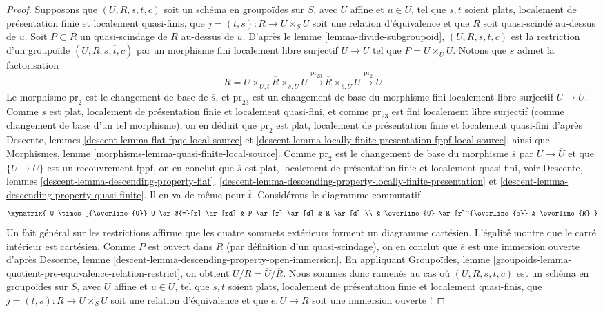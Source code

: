 \begin{proof}
\medskip\noindent
Supposons que $(U, R, s, t, c)$ soit un schéma en groupoïdes sur $S$,
avec $U$ affine et $u \in U$, tel que $s, t$ soient plats, localement
de présentation finie et localement quasi-finis, que
$j = (t, s) : R \to U \times_S U$ soit une relation d'équivalence
et que $R$ soit quasi-scindé au-dessus de $u$. Soit $P \subset R$ un quasi-scindage
de $R$ au-dessus de $u$. D'après le
lemme \ref{lemma-divide-subgroupoid},
$(U, R, s, t, c)$ est la restriction d'un groupoïde
$(\overline{U}, \overline{R}, \overline{s}, \overline{t}, \overline{c})$
par un morphisme fini localement libre surjectif $U \to \overline{U}$ tel que
$P = U \times_{\overline{U}} U$. Notons que $s$ admet la factorisation
$$
R = U \times_{\overline{U}, \overline{t}} \overline{R}
\times_{\overline{s}, \overline{U}} U
\xrightarrow{\text{pr}_{23}}
\overline{R} \times_{\overline{s}, \overline{U}} U
\xrightarrow{\text{pr}_2} U
$$
Le morphisme $\text{pr}_2$ est le changement de base de $\overline{s}$, et
$\text{pr}_{23}$ est un changement de base du morphisme fini localement libre
surjectif $U \to \overline{U}$. Comme $s$ est plat, localement
de présentation finie et localement quasi-fini, et comme $\text{pr}_{23}$
est fini localement libre surjectif (comme changement de base d'un tel morphisme),
on en déduit que $\text{pr}_2$ est plat, localement
de présentation finie et localement quasi-fini d'après
Descente, lemmes
\ref{descent-lemma-flat-fpqc-local-source} et
\ref{descent-lemma-locally-finite-presentation-fppf-local-source}, ainsi que
Morphismes, lemme \ref{morphisms-lemma-quasi-finite-local-source}.
Comme $\text{pr}_2$ est le changement de base du morphisme
$\overline{s}$ par $U \to \overline{U}$ et que $\{U \to \overline{U}\}$
est un recouvrement fppf, on en conclut que $\overline{s}$ est
plat, localement de présentation finie et localement quasi-fini, voir
Descente, lemmes \ref{descent-lemma-descending-property-flat},
\ref{descent-lemma-descending-property-locally-finite-presentation} et
\ref{descent-lemma-descending-property-quasi-finite}. Il en va de même
pour $\overline{t}$. Considérons le diagramme commutatif
$$
\xymatrix{
U \times_{\overline{U}} U \ar@{=}[r] \ar[rd] & P \ar[r] \ar[d] & R \ar[d] \\
& \overline{U} \ar[r]^{\overline{e}} & \overline{R}
}
$$
Un fait général sur les restrictions affirme que les quatre sommets extérieurs
forment un diagramme cartésien. L'égalité montre que le carré intérieur est
cartésien. Comme $P$ est ouvert dans $R$ (par définition d'un quasi-scindage),
on en conclut que $\overline{e}$ est une immersion ouverte d'après
Descente, lemme \ref{descent-lemma-descending-property-open-immersion}.
En appliquant
Groupoïdes,
lemme \ref{groupoids-lemma-quotient-pre-equivalence-relation-restrict},
on obtient $U/R = \overline{U}/\overline{R}$. Nous sommes donc ramenés
au cas où $(U, R, s, t, c)$ est un schéma en groupoïdes sur $S$,
avec $U$ affine et $u \in U$, tel que $s, t$ soient plats, localement
de présentation finie et localement quasi-finis, que
$j = (t, s) : R \to U \times_S U$ soit une relation d'équivalence
et que $e : U \to R$ soit une immersion ouverte !


\end{proof}
